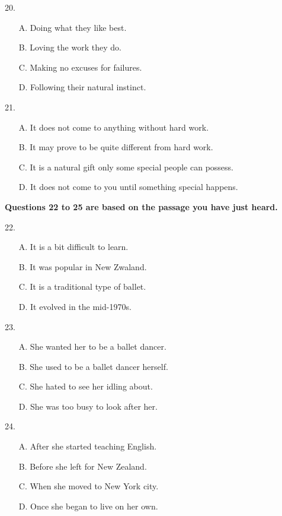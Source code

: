 \documentclass[UTF8,11pt]{ctexart}
\begin{document}
20.


\begin{itemize}[leftmargin=2em,itemsep=.2em,topsep=.4em]\item[A.] Doing what they like best.
\item[B.] Loving the work they do.
\item[C.] Making no excuses for failures.
\item[D.] Following their natural instinct.
\end{itemize}

21.


\begin{itemize}[leftmargin=2em,itemsep=.2em,topsep=.4em]\item[A.] It does not come to anything without hard work.
\item[B.] It may prove to be quite different from hard work.
\item[C.] It is a natural gift only some special people can possess.
\item[D.] It does not come to you until something special happens.
\end{itemize}

\textbf{Questions 22 to 25 are based on the passage you have just heard.}


22.


\begin{itemize}[leftmargin=2em,itemsep=.2em,topsep=.4em]\item[A.] It is a bit difficult to learn.
\item[B.] It was popular in New Zwaland.
\item[C.] It is a traditional type of ballet.
\item[D.] It evolved in the mid-1970s.
\end{itemize}

23.


\begin{itemize}[leftmargin=2em,itemsep=.2em,topsep=.4em]\item[A.] She wanted her to be a ballet dancer.
\item[B.] She used to be a ballet dancer herself.
\item[C.] She hated to see her idling about.
\item[D.] She was too busy to look after her.
\end{itemize}

24.


\begin{itemize}[leftmargin=2em,itemsep=.2em,topsep=.4em]\item[A.] After she started teaching English.
\item[B.] Before she left for New Zealand.
\item[C.] When she moved to New York city.
\item[D.] Once she began to live on her own.
\end{itemize}
\end{document}
